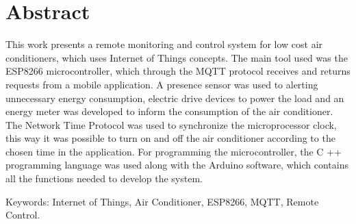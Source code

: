 \chapter*{Abstract}
\thispagestyle{empty}

This work presents a remote monitoring and control system for low cost air conditioners, which
uses Internet of Things concepts. The main tool used was the ESP8266 microcontroller, which through the MQTT protocol receives and returns requests from a mobile application. A presence sensor was used to
alerting unnecessary energy consumption, electric drive devices to power the load and an energy meter was developed to inform the consumption of the air conditioner. The Network Time Protocol was used to synchronize the
microprocessor clock, this way it was possible to turn on and off the air conditioner according to the chosen time in the application. For programming the microcontroller, the C ++ programming language was used along with the Arduino software,
which contains all the functions needed to develop the system.


\noindent \textsf{Keywords:} Internet of Things, Air Conditioner, ESP8266, MQTT, Remote Control.

\cleardoublepage
